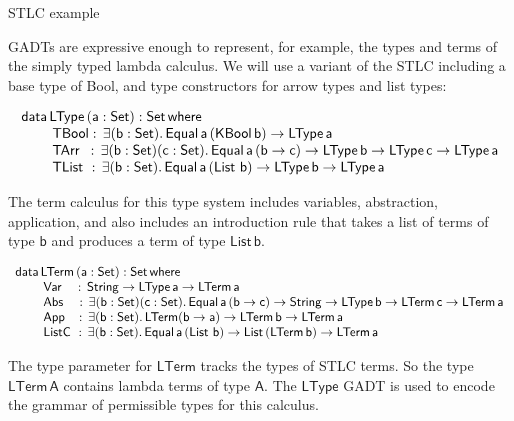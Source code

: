 \documentclass[acmsmall,screen,review,anonymous]{acmart}
\theoremstyle{definition}
\begin{document}
{\color{red} STLC example}

GADTs are expressive enough to represent, for example, the types and terms of the simply typed lambda calculus. 
We will use a variant of the STLC including a base type of Bool, and type constructors for arrow types and list types: 

\begin{equation}\label{eq:eq_ltype}
\begin{array}{l}
\mathsf{data\, LType\,(a : Set) : Set\,where}\\
\mathsf{\;\;\;\;\;\;\;\;TBool :\, \exists (b : Set). \,Equal\,a\,(KBool\, b) \to LType\,a}\\
\mathsf{\;\;\;\;\;\;\;\;TArr\,\,\, :\, \exists (b : Set) (c : Set).\,Equal\,a\,(b \to c) \to LType\,b \to LType\,c \to LType\,a}\\
  \mathsf{\;\;\;\;\;\;\;\;TList\,\, :\, \exists (b : Set).\,Equal\,a\,(\mathsf{List}\,\,b) \to LType\,b \to LType\,a}
\end{array}
\end{equation}

The term calculus for this type system includes variables, abstraction, application, 
and also includes an introduction rule that takes a list of terms of type $\mathsf{b}$ and produces a term of type $\mathsf{List\,b}$.


\begin{equation}\label{eq:eq_lterm}
\begin{array}{l}
\mathsf{data\, LTerm\,(a : Set) : Set\,where}\\
\mathsf{\;\;\;\;\;\;\;\;Var\,\,\,\,\,\,:\, String \to LType\,a \to LTerm\,a} \\
\mathsf{\;\;\;\;\;\;\;\;Abs\,\,\,\,\,\, :\, \exists (b : Set) (c : Set).\,Equal\,a\,(b \to c) \to String 
      \to LType\,b \to LTerm\,c \to LTerm\,a}\\
  \mathsf{\;\;\;\;\;\;\;\;App\,\,\,\,\, :\, \exists (b : Set).\,LTerm (b \to a) \to LTerm\,b \to LTerm\,a}\\
  \mathsf{\;\;\;\;\;\;\;\;ListC\,\, :\, \exists (b : Set).\,Equal\,a\,(\mathsf{List}\,\,b) \to List\,(LTerm\,b) \to LTerm\,a}
\end{array}
\end{equation}

The type parameter for $\mathsf{LTerm}$ tracks the types of STLC terms. So the type $\mathsf{LTerm\,A}$ 
contains lambda terms of type $\mathsf{A}$. The $\mathsf{LType}$ GADT is used to encode the 
grammar of permissible types for this calculus. 
\end{document}
